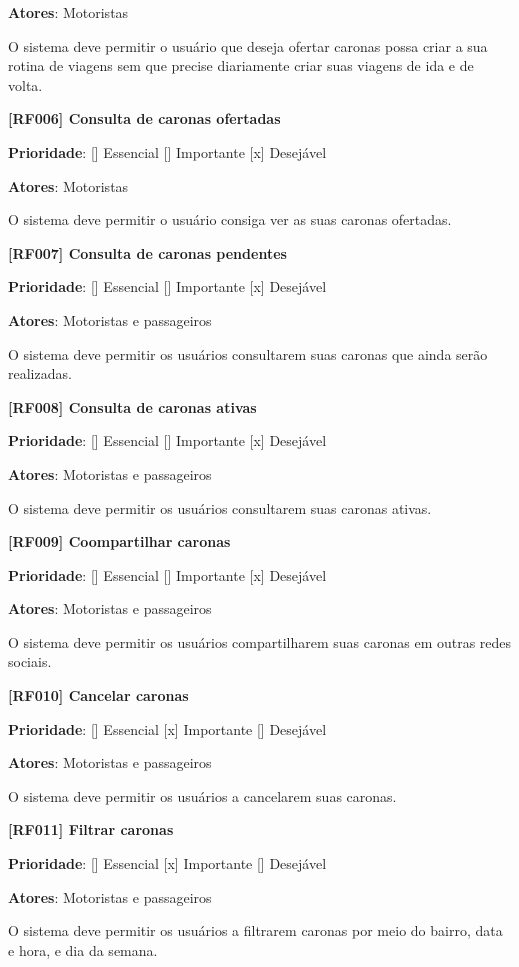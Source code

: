 \textbf{Atores}: Motoristas

O sistema deve permitir o usuário que deseja ofertar caronas possa criar a sua rotina de viagens sem que precise diariamente criar suas viagens de ida e de volta.


\textbf{[RF006] Consulta de caronas ofertadas}

\textbf{Prioridade}:      [] Essencial        [] Importante     [x] Desejável 

\textbf{Atores}: Motoristas

O sistema deve permitir o usuário consiga ver as suas caronas ofertadas.


\textbf{[RF007] Consulta de caronas pendentes}

\textbf{Prioridade}:      [] Essencial        [] Importante     [x] Desejável 

\textbf{Atores}: Motoristas e passageiros

O sistema deve permitir os usuários consultarem suas caronas que ainda serão realizadas.

\textbf{[RF008] Consulta de caronas ativas}

\textbf{Prioridade}:      [] Essencial        [] Importante     [x] Desejável 

\textbf{Atores}: Motoristas e passageiros

O sistema deve permitir os usuários consultarem suas caronas ativas.

\textbf{[RF009] Coompartilhar caronas}

\textbf{Prioridade}:      [] Essencial        [] Importante     [x] Desejável 

\textbf{Atores}: Motoristas e passageiros

O sistema deve permitir os usuários compartilharem suas caronas em outras redes sociais.

\textbf{[RF010] Cancelar caronas}

\textbf{Prioridade}:      [] Essencial        [x] Importante     [] Desejável 

\textbf{Atores}: Motoristas e passageiros

O sistema deve permitir os usuários a cancelarem suas caronas.


\textbf{[RF011] Filtrar caronas}

\textbf{Prioridade}:      [] Essencial        [x] Importante     [] Desejável 

\textbf{Atores}: Motoristas e passageiros

O sistema deve permitir os usuários a filtrarem caronas por meio do bairro, data e hora, e dia da semana.

